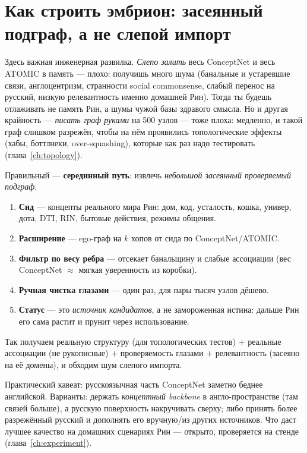 \section{Как строить эмбрион: засеянный подграф, а не слепой импорт}
\label{sec:embryo-build}

Здесь важная инженерная развилка. \emph{Слепо залить} весь ConceptNet и весь ATOMIC
в память — плохо: получишь много шума (банальные и устаревшие связи, англоцентризм,
странности social commonsense, слабый перенос на русский, низкую релевантность
именно домашней Рин). Тогда ты будешь отлаживать не память Рин, а шумы чужой базы
здравого смысла. Но и другая крайность — \emph{писать граф руками} на 500 узлов —
тоже плоха: медленно, и такой граф слишком разрежён, чтобы на нём проявились
топологические эффекты (хабы, боттлнеки, over-squashing), которые как раз надо
тестировать (глава~\ref{ch:topology}).

Правильный — \textbf{серединный путь}: извлечь \emph{небольшой засеянный проверяемый
подграф}.
\begin{enumerate}\itemsep1pt
\item \textbf{Сид} — концепты реального мира Рин: дом, код, усталость, кошка, универ,
дота, DTI, RIN, бытовые действия, режимы общения.
\item \textbf{Расширение} — ego-граф на $k$ хопов от сида по ConceptNet/ATOMIC.
\item \textbf{Фильтр по весу ребра} — отсекает банальщину и слабые ассоциации
(вес ConceptNet $\approx$ мягкая уверенность из коробки).
\item \textbf{Ручная чистка глазами} — один раз, для пары тысяч узлов дёшево.
\item \textbf{Статус} — это \emph{источник кандидатов}, а не замороженная истина:
дальше Рин его сама растит и прунит через использование.
\end{enumerate}
Так получаем реальную структуру (для топологических тестов) $+$ реальные ассоциации
(не рукописные) $+$ проверяемость глазами $+$ релевантность (засеяно на её домены), и
обходим шум слепого импорта.

\begin{openq}
Практический кавеат: русскоязычная часть ConceptNet заметно беднее английской.
Варианты: держать \emph{концептный backbone} в англо-пространстве (там связей
больше), а русскую поверхность накручивать сверху; либо принять более разрежённый
русский и дополнять его вручную/из других источников. Что даст лучшее качество на
домашних сценариях Рин — открыто, проверяется на стенде (глава~\ref{ch:experiment}).
\end{openq}

